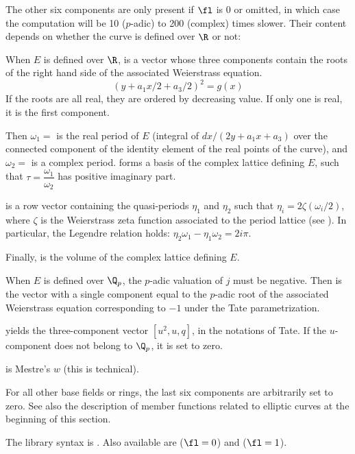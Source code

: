 The other six components are only present if $\fl$ is $0$ or omitted, in
which case the computation will be 10 ($p$-adic) to 200 (complex) times
slower. Their content depends on whether the curve is defined over $\R$ or
not:
\smallskip
\item When $E$ is defined over $\R$,  is a vector whose
three components contain the roots of the right hand side of the associated
Weierstrass equation.
$$ (y + a_1x/2 + a_3/2)^2 = g(x) $$
If the roots are all real, they are ordered by decreasing value. If only
one is real, it is the first component.

Then $\omega_1 = $ is the real period of $E$ (integral of
$dx/(2y+a_1x+a_3)$ over the connected component of the identity element of
the real points of the curve), and $\omega_2 = $ is a
complex period.  forms a basis of the
complex lattice defining $E$, such that
$\tau=\dfrac{\omega_1}{\omega_2}$ has positive imaginary part.

 is a row vector containing the quasi-periods $\eta_1$ and
$\eta_2$ such that $\eta_i = 2\zeta(\omega_i/2)$, where $\zeta$ is the
Weierstrass zeta function associated to the period lattice (see
). In particular, the Legendre relation holds:
$\eta_2\omega_1 - \eta_1\omega_2 = 2i\pi$.

Finally,  is the volume of the complex lattice defining
$E$.\smallskip

\item When $E$ is defined over $\Q_p$, the $p$-adic valuation of $j$
must be negative. Then  is the vector with a single component
equal to the $p$-adic root of the associated Weierstrass equation
corresponding to $-1$ under the Tate parametrization.

 yields the three-component vector $[u^2,u,q]$, in the
notations of Tate. If the $u$-component does not belong to $\Q_p$, it is set
to zero.

 is Mestre's $w$ (this is technical).

\smallskip For all other base fields or rings, the last six components are
arbitrarily set to zero. See also the description of member functions
related to elliptic curves at the beginning of this section.

The library syntax is .
Also available are  ($\fl=0$) and
 ($\fl=1$).

